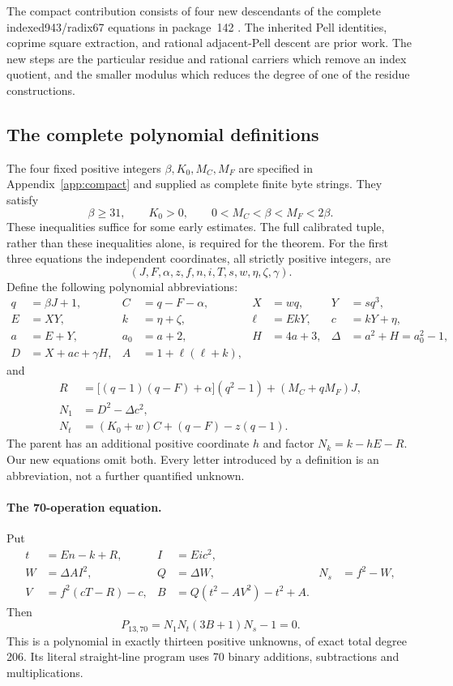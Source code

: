 The compact contribution consists of four new descendants of the complete
indexed943/radix67 equations in package~142 \cite{coprime}. The inherited
Pell identities, coprime square extraction, and rational adjacent-Pell
descent are prior work. The new steps are the particular residue and
rational carriers which remove an index quotient, and the smaller modulus
which reduces the degree of one of the residue constructions.

\subsection{The complete polynomial definitions}

The four fixed positive integers $\beta,K_0,M_C,M_F$ are specified in
Appendix~\ref{app:compact} and supplied as complete finite byte strings.
They satisfy
\[
 \beta\ge31,\qquad K_0>0,\qquad 0<M_C<\beta<M_F<2\beta.
\]
These inequalities suffice for some early estimates. The full calibrated
tuple, rather than these inequalities alone, is required for the theorem.
For the first three equations the independent coordinates, all strictly
positive integers, are
\[
 (J,F,\alpha,z,f,n,i,T,s,w,\eta,\zeta,\gamma).
\]
Define the following polynomial abbreviations:
\begin{align*}
 q&=\beta J+1,& C&=q-F-\alpha,& X&=wq,&Y&=sq^3,\\
 E&=XY,&k&=\eta+\zeta,&\ell&=EkY,&c&=kY+\eta,\\
 a&=E+Y,&a_0&=a+2,&H&=4a+3,&\Delta&=a^2+H=a_0^2-1,\\
 D&=X+ac+\gamma H,&A&=1+\ell(\ell+k),
 \end{align*}
and
\begin{align*}
 R&=\bigl[(q-1)(q-F)+\alpha\bigr](q^2-1)+(M_C+qM_F)J,\\
 N_1&=D^2-\Delta c^2,\\
 N_t&=(K_0+w)C+(q-F)-z(q-1).
\end{align*}
The parent has an additional positive coordinate $h$ and factor
$N_k=k-hE-R$. Our new equations omit both. Every letter introduced by a
definition is an abbreviation, not a further quantified unknown.

\paragraph{The 70-operation equation.}
Put
\begin{align*}
 t&=En-k+R,& I&=Ei c^2,\\
 W&=\Delta A I^2,&Q&=\Delta W,&N_s&=f^2-W,\\
 V&=f^2(cT-R)-c,&B&=Q(t^2-AV^2)-t^2+A.
\end{align*}
Then
\begin{equation}\label{eq:p13raw}
 \boxed{P_{13,70}=N_1N_t(3B+1)N_s-1=0.}
\end{equation}
This is a polynomial in exactly thirteen positive unknowns, of exact
total degree 206. Its literal straight-line program uses 70 binary
additions, subtractions and multiplications.

